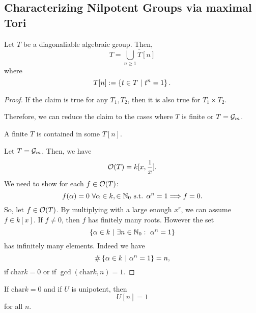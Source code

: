 \subsection{Characterizing Nilpotent Groups via maximal Tori}

\begin{lemma}
	Let $T$ be a diagonaliable algebraic group. Then,
	\[ T = \overline{\bigcup_{n \geq 1} T[n]} \]
	where
	\[ T[n] := \left\lbrace t \in T ~ | ~ t^n = 1\right\rbrace. \]
\end{lemma}
\begin{proof}
	If the claim is true for any $T_1, T_2$, then it is also true for $T_1\times T_2$.
	
	Therefore, we can reduce the claim to the cases where $T$ is finite or $T = \mathcal{G}_m$.
	
	A finite $T$ is contained in some $T[n]$.
	
	Let $T = \mathcal{G}_m$. Then, we have
	\[ \mathcal{O}(T) = k[x, \frac{1}{x}]. \]
	We need to show for each $f \in \mathcal{O}(T)$:
	\[ f(\alpha)  = 0 ~\forall \alpha \in k, \in \mathbb{N}_0 \text{ s.t. } \alpha^n = 1 \overset{}{\Longrightarrow} f = 0. \]
	So, let $f \in \mathcal{O}(T)$. By multiplying with a large enough $x^r$, we can assume $f \in k[x]$. If $f\neq 0$, then $f$ has finitely many roots. However the set
	\[ \left\lbrace\alpha \in k ~ | ~ \exists n \in \mathbb{N}_0:~ \alpha^n = 1\right\rbrace \]
	has infinitely many elements. Indeed we have
	\[\# \left\lbrace\alpha \in k ~ | ~  \alpha^n = 1\right\rbrace = n, \]
	if $\mathrm{char} k = 0$ or if $\gcd(\mathrm{char} k , n) = 1$.
\end{proof}
\begin{remark}
	If $\mathrm{char} k = 0$ and if $U$ is unipotent, then
	\[U[n] = 1  \]
	for all $n$.
\end{remark}

